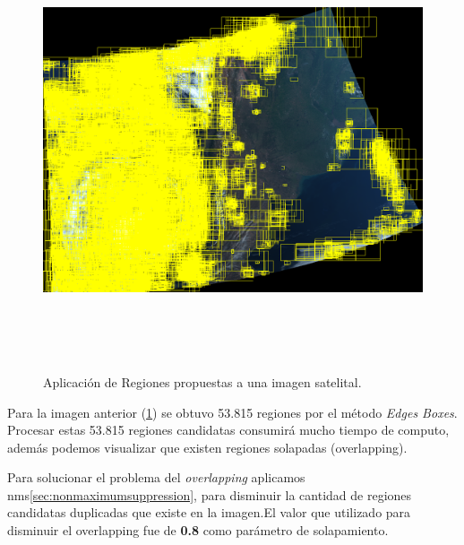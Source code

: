 \begin{figure}[H]
 \centering
  \includegraphics[height=13cm,keepaspectratio=true,clip=true]{imagenes/Logos/proposal.png}
  \caption{Aplicación de Regiones propuestas a una imagen satelital.}
	\label{Fig: proposal}
\end{figure}

Para la imagen anterior (\ref{Fig: proposal}) se obtuvo 53.815 regiones por el método \textit{Edges Boxes}. Procesar estas 53.815 regiones candidatas consumirá mucho tiempo de computo, además podemos visualizar que existen regiones solapadas (overlapping). 

Para solucionar el problema del \textit{overlapping}  aplicamos \ac{nms}\ref{sec:nonmaximumsuppression}, para disminuir la cantidad de regiones candidatas duplicadas que existe en la imagen.El valor que utilizado para disminuir el overlapping fue de \textbf{0.8} como parámetro de solapamiento.

